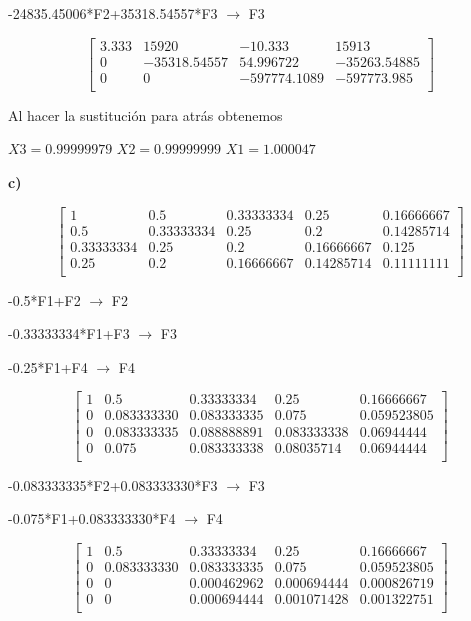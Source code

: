 \documentclass[12pt]{article}
\begin{document}
-24835.45006*F2+35318.54557*F3 $\longrightarrow $ F3

\[
\begin{bmatrix}
3.333 & 15920 & -10.333 & 15913\\
0 & -35318.54557 & 54.996722 & -35263.54885 \\
0 & 0 & -597774.1089 & -597773.985\\
\end{bmatrix}
\]

Al hacer la sustitución para atrás obtenemos

$X3 = 0.99999979$   $X2 =0.99999999$  $X1 =1.000047$ 


\textbf{c)}

\[
\begin{bmatrix}
1 & 0.5 & 0.33333334 & 0.25 & 0.16666667 \\
0.5 & 0.33333334 & 0.25 & 0.2 & 0.14285714\\
0.33333334 & 0.25 & 0.2 & 0.16666667 & 0.125\\
0.25 & 0.2 & 0.16666667 & 0.14285714 & 0.11111111\\
\end{bmatrix}
\]

-0.5*F1+F2  $\longrightarrow $ F2

-0.33333334*F1+F3 $\longrightarrow $ F3

-0.25*F1+F4  $\longrightarrow $ F4

\[
\begin{bmatrix}
1 & 0.5 & 0.33333334 & 0.25 & 0.16666667 \\
0 & 0.083333330 & 0.083333335 & 0.075 & 0.059523805\\
0 & 0.083333335 & 0.088888891 & 0.083333338 & 0.06944444\\
0 & 0.075 & 0.083333338 & 0.08035714 & 0.06944444\\
\end{bmatrix}
\]

-0.083333335*F2+0.083333330*F3  $\longrightarrow $ F3

-0.075*F1+0.083333330*F4 $\longrightarrow $ F4

\[
\begin{bmatrix}
1 & 0.5 & 0.33333334 & 0.25 & 0.16666667 \\
0 & 0.083333330 & 0.083333335 & 0.075 & 0.059523805\\
0 & 0 & 0.000462962 & 0.000694444 & 0.000826719\\
0 & 0 & 0.000694444 & 0.001071428 & 0.001322751\\
\end{bmatrix}
\]
\end{document}
